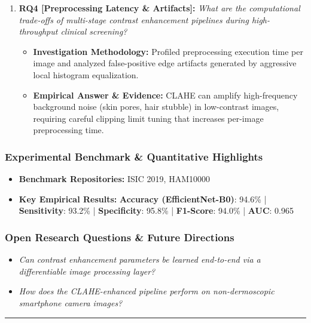 \begin{enumerate}[label=\textbf{\arabic*.}, leftmargin=*]
\begin{itemize}[leftmargin=1.5em]
  \end{itemize}
  \item \textbf{RQ4 [Preprocessing Latency \& Artifacts]:} \textit{What are the computational trade-offs of multi-stage contrast enhancement pipelines during high-throughput clinical screening?}
  \begin{itemize}[leftmargin=1.5em]
    \item \textbf{Investigation Methodology:} Profiled preprocessing execution time per image and analyzed false-positive edge artifacts generated by aggressive local histogram equalization.
    \item \textbf{Empirical Answer \& Evidence:} CLAHE can amplify high-frequency background noise (skin pores, hair stubble) in low-contrast images, requiring careful clipping limit tuning that increases per-image preprocessing time.
  \end{itemize}
\end{enumerate}

\subsubsection*{Experimental Benchmark \& Quantitative Highlights}
\begin{itemize}[leftmargin=*]
  \item \textbf{Benchmark Repositories:} ISIC 2019, HAM10000
  \item \textbf{Key Empirical Results:} \textbf{Accuracy (EfficientNet-B0)}: 94.6\% \quad | \quad \textbf{Sensitivity}: 93.2\% \quad | \quad \textbf{Specificity}: 95.8\% \quad | \quad \textbf{F1-Score}: 94.0\% \quad | \quad \textbf{AUC}: 0.965
\end{itemize}

\subsubsection*{Open Research Questions \& Future Directions}
\begin{itemize}[leftmargin=*]
  \item \textit{Can contrast enhancement parameters be learned end-to-end via a differentiable image processing layer?}
  \item \textit{How does the CLAHE-enhanced pipeline perform on non-dermoscopic smartphone camera images?}
\end{itemize}
\vspace{0.8em}\hrule\vspace{1.2em}
